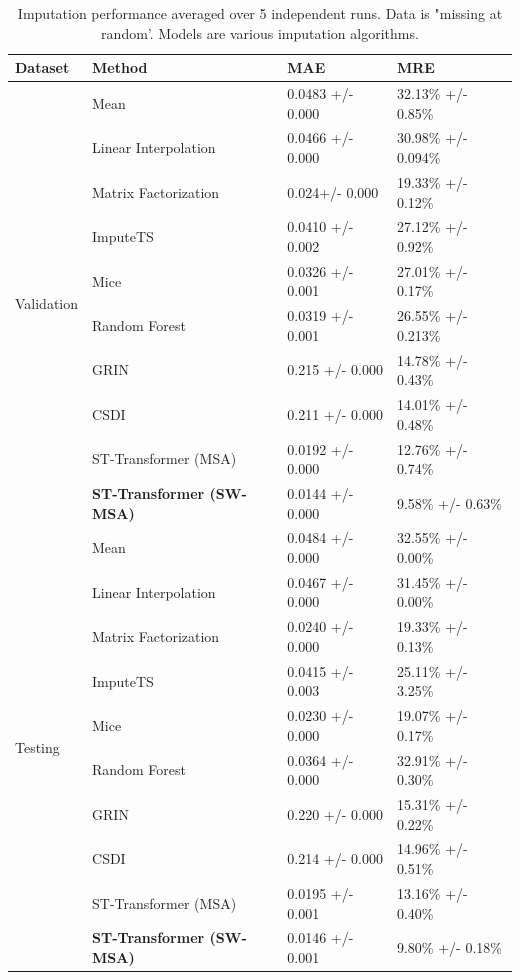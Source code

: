 \documentclass[11pt]{article}
\begin{document}
\begin{table}[h!]
    \centering
    \begin{tabularx}{\textwidth}{llXX}
        \toprule
        Dataset & Method & MAE & MRE \\
        \midrule
         \multirow{10}{*}{Validation}&Mean & 0.0483 +/- 0.000& 32.13\% +/- 0.85\%  \\
        &Linear Interpolation & 0.0466 +/- 0.000 & 30.98\% +/- 0.094\%\\
        &Matrix Factorization & 0.024+/- 0.000 & 19.33\% +/- 0.12\% \\
        &ImputeTS & 0.0410 +/- 0.002 & 27.12\% +/- 0.92\% \\
        &Mice & 0.0326 +/- 0.001& 27.01\% +/- 0.17\% \\
        &Random Forest &  0.0319 +/- 0.001&  26.55\% +/- 0.213\%\\
   		&GRIN &0.215 +/- 0.000 & 14.78\% +/- 0.43\%\\
        &CSDI & 0.211 +/- 0.000 & 14.01\% +/- 0.48\%\\
        &ST-Transformer (MSA) & 0.0192 +/- 0.000 & 12.76\% +/- 0.74\%\\
        &\textbf{ST-Transformer (SW-MSA)} & 0.0144 +/- 0.000 & 9.58\% +/- 0.63\%\\
        
        \midrule
        \multirow{10}{*}{Testing}&Mean & 0.0484 +/- 0.000 & 32.55\% +/- 0.00\%  \\
        &Linear Interpolation & 0.0467 +/- 0.000& 31.45\% +/- 0.00\%\\
        &Matrix Factorization & 0.0240 +/- 0.000& 19.33\% +/- 0.13\% \\
        &ImputeTS & 0.0415 +/- 0.003 & 25.11\% +/- 3.25\% \\
        &Mice & 0.0230 +/- 0.000& 19.07\% +/- 0.17\% \\
        &Random Forest &  0.0364 +/- 0.000&  32.91\% +/- 0.30\%\\
        &GRIN &0.220 +/- 0.000 & 15.31\% +/- 0.22\%\\
        &CSDI & 0.214 +/- 0.000 & 14.96\% +/- 0.51\%\\
        &ST-Transformer (MSA) & 0.0195 +/- 0.001 & 13.16\% +/- 0.40\%\\

        &\textbf{ST-Transformer (SW-MSA)} & 0.0146 +/- 0.001 & 9.80\% +/- 0.18\%\\
        
        \bottomrule

        
    \end{tabularx}
    \caption{Imputation performance averaged over 5 independent runs. Data is "missing at random'. Models are various imputation algorithms.}
    \label{tab: missing at random}
\end{table}
\end{document}
